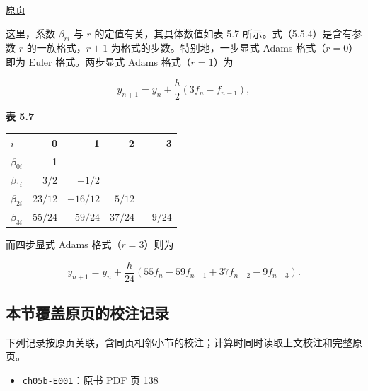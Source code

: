 \documentclass[
  10pt,
  fontset=fandol]{ctexart}
\newcounter{none} %
\providecommand{\tightlist}{%
  \setlength{\itemsep}{0pt}\setlength{\parskip}{0pt}}
\begin{document}
\href{../../source-images/pdf-139.jpeg}{原页}

这里，系数 \(\beta_{ri}\) 与 \(r\) 的定值有关，其具体数值如表 5.7 所示。式（5.5.4）是含有参数 \(r\) 的一族格式，\(r+1\) 为格式的步数。特别地，一步显式 Adams 格式（\(r=0\)）即为 Euler 格式。两步显式 Adams 格式（\(r=1\)）为

\[
y_{n+1}=y_n+\frac h2(3f_n-f_{n-1}),
\tag{5.5.5}
\]

\textbf{表 5.7}

{\def\LTcaptype{none} %
\begin{longtable}[]{@{}lrrrr@{}}
\toprule\noalign{}
\(i\) & 0 & 1 & 2 & 3 \\
\midrule\noalign{}
\endhead
\bottomrule\noalign{}
\endlastfoot
\(\beta_{0i}\) & 1 & & & \\
\(\beta_{1i}\) & \(3/2\) & \(-1/2\) & & \\
\(\beta_{2i}\) & \(23/12\) & \(-16/12\) & \(5/12\) & \\
\(\beta_{3i}\) & \(55/24\) & \(-59/24\) & \(37/24\) & \(-9/24\) \\
\end{longtable}
}

而四步显式 Adams 格式（\(r=3\)）则为

\[
y_{n+1}=y_n+\frac h{24}(55f_n-59f_{n-1}+37f_{n-2}-9f_{n-3}).
\tag{5.5.6}
\]

\subsection{本节覆盖原页的校注记录}\label{ux672cux8282ux8986ux76d6ux539fux9875ux7684ux6821ux6ce8ux8bb0ux5f55}

下列记录按原页关联，含同页相邻小节的校注；计算时同时读取上文校注和完整原页。

\begin{itemize}
\tightlist
\item
  \texttt{ch05b-E001}：原书 PDF 页 138
\end{itemize}
\end{document}
